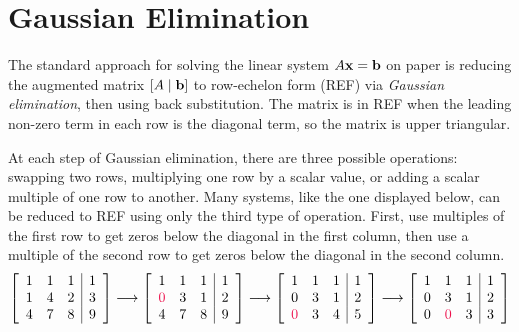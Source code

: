 
\section*{Gaussian Elimination} %

The standard approach for solving the linear system $A\mathbf{x} = \mathbf{b}$ on paper is reducing the augmented matrix $\left[A\mid\mathbf{b}\right]$ to row-echelon form (REF) via \emph{Gaussian elimination}, then using back substitution.
The matrix is in REF when the leading non-zero term in each row is the diagonal term, so the matrix is upper triangular.

At each step of Gaussian elimination, there are three possible operations: swapping two rows, multiplying one row by a scalar value, or adding a scalar multiple of one row to another.
Many systems, like the one displayed below, can be reduced to REF using only the third type of operation.
First, use multiples of the first row to get zeros below the diagonal in the first column, then use a multiple of the second row to get zeros below the diagonal in the second column.
%
\begin{align*}
\left[\begin{array}{ccc|c}
1 & 1 & 1 & 1 \\
1 & 4 & 2 & 3 \\
4 & 7 & 8 & 9 \\
\end{array}\right]
\longrightarrow
\left[\begin{array}{ccc|c}
1 & 1 & 1 & 1 \\
\textcolor{red}0 & 3 & 1 & 2 \\
4 & 7 & 8 & 9 \\
\end{array}\right]
\longrightarrow
\left[\begin{array}{ccc|c}
1 & 1 & 1 & 1 \\
0 & 3 & 1 & 2 \\
\textcolor{red}0 & 3 & 4 & 5 \\
\end{array}\right]
\longrightarrow
\left[\begin{array}{ccc|c}
1 & 1 & 1 & 1 \\
0 & 3 & 1 & 2 \\
0 & \textcolor{red}0 & 3 & 3
\end{array}\right]
\end{align*}

